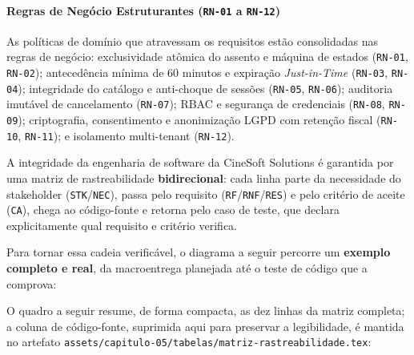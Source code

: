 \paragraph{\texorpdfstring{Regras de Negócio Estruturantes (\texttt{RN-01} a \texttt{RN-12})}{Regras de Negócio Estruturantes (RN-01 a RN-12)}}

As políticas de domínio que atravessam os requisitos estão consolidadas nas regras de negócio: exclusividade atômica do assento e máquina de estados (\texttt{RN-01}, \texttt{RN-02}); antecedência mínima de 60 minutos e expiração \emph{Just-in-Time} (\texttt{RN-03}, \texttt{RN-04}); integridade do catálogo e anti-choque de sessões (\texttt{RN-05}, \texttt{RN-06}); auditoria imutável de cancelamento (\texttt{RN-07}); RBAC e segurança de credenciais (\texttt{RN-08}, \texttt{RN-09}); criptografia, consentimento e anonimização LGPD com retenção fiscal (\texttt{RN-10}, \texttt{RN-11}); e isolamento multi-tenant (\texttt{RN-12}).


A integridade da engenharia de software da CineSoft Solutions é garantida por uma matriz de rastreabilidade \textbf{bidirecional}: cada linha parte da necessidade do stakeholder (\texttt{STK}/\texttt{NEC}), passa pelo requisito (\texttt{RF}/\texttt{RNF}/\texttt{RES}) e pelo critério de aceite (\texttt{CA}), chega ao código-fonte e retorna pelo caso de teste, que declara explicitamente qual requisito e critério verifica.

Para tornar essa cadeia verificável, o diagrama a seguir percorre um \textbf{exemplo completo e real}, da macroentrega planejada até o teste de código que a comprova:


O quadro a seguir resume, de forma compacta, as dez linhas da matriz completa; a coluna de código-fonte, suprimida aqui para preservar a legibilidade, é mantida no artefato \texttt{assets/capitulo-05/tabelas/matriz-rastreabilidade.tex}:

